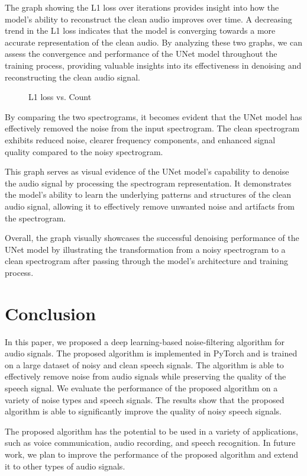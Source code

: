 \documentclass[conference]{IEEEtran}
\begin{document}
The graph showing the L1 loss over iterations provides insight into how the model's ability to reconstruct the clean audio improves over time. A decreasing trend in the L1 loss indicates that the model is converging towards a more accurate representation of the clean audio. By analyzing these two graphs, we can assess the convergence and performance of the UNet model throughout the training process, providing valuable insights into its effectiveness in denoising and reconstructing the clean audio signal.

\begin{figure}[t!]
    \centering
    
    \caption{L1 loss vs. Count}
\end{figure}

By comparing the two spectrograms, it becomes evident that the UNet model has effectively removed the noise from the input spectrogram. The clean spectrogram exhibits reduced noise, clearer frequency components, and enhanced signal quality compared to the noisy spectrogram.

This graph serves as visual evidence of the UNet model's capability to denoise the audio signal by processing the spectrogram representation. It demonstrates the model's ability to learn the underlying patterns and structures of the clean audio signal, allowing it to effectively remove unwanted noise and artifacts from the spectrogram.

Overall, the graph visually showcases the successful denoising performance of the UNet model by illustrating the transformation from a noisy spectrogram to a clean spectrogram after passing through the model's architecture and training process.

\section{Conclusion}
In this paper, we proposed a deep learning-based noise-filtering algorithm for audio signals. The proposed algorithm is implemented in PyTorch and is trained on a large dataset of noisy and clean speech signals. The algorithm is able to effectively remove noise from audio signals while preserving the quality of the speech signal. We evaluate the performance of the proposed algorithm on a variety of noise types and speech signals. The results show that the proposed algorithm is able to significantly improve the quality of noisy speech signals.

The proposed algorithm has the potential to be used in a variety of applications, such as voice communication, audio recording, and speech recognition. In future work, we plan to improve the performance of the proposed algorithm and extend it to other types of audio signals.



	
\end{document}
